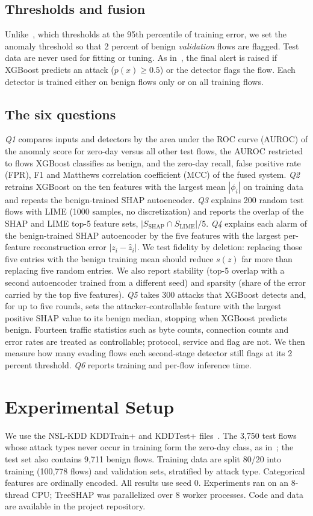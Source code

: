 \documentclass[conference]{IEEEtran}
\begin{document}
\subsection{Thresholds and fusion}
Unlike~\cite{barnard2022robust}, which thresholds at the 95th percentile of training error, we set the anomaly threshold so that 2 percent of benign \emph{validation} flows are flagged. Test data are never used for fitting or tuning. As in~\cite{barnard2022robust}, the final alert is raised if XGBoost predicts an attack ($p(x)\geq 0.5$) or the detector flags the flow. Each detector is trained either on benign flows only or on all training flows.

\subsection{The six questions}
\textit{Q1} compares inputs and detectors by the area under the ROC curve (AUROC) of the anomaly score for zero-day versus all other test flows, the AUROC restricted to flows XGBoost classifies as benign, and the zero-day recall, false positive rate (FPR), F1 and Matthews correlation coefficient (MCC) of the fused system.
\textit{Q2} retrains XGBoost on the ten features with the largest mean $|\phi_i|$ on training data and repeats the benign-trained SHAP autoencoder.
\textit{Q3} explains 200 random test flows with LIME (1000 samples, no discretization) and reports the overlap of the SHAP and LIME top-5 feature sets, $|S_{\mathrm{SHAP}}\cap S_{\mathrm{LIME}}|/5$.
\textit{Q4} explains each alarm of the benign-trained SHAP autoencoder by the five features with the largest per-feature reconstruction error $|z_i-\hat{z}_i|$. We test fidelity by deletion: replacing those five entries with the benign training mean should reduce $s(z)$ far more than replacing five random entries. We also report stability (top-5 overlap with a second autoencoder trained from a different seed) and sparsity (share of the error carried by the top five features).
\textit{Q5} takes 300 attacks that XGBoost detects and, for up to five rounds, sets the attacker-controllable feature with the largest positive SHAP value to its benign median, stopping when XGBoost predicts benign. Fourteen traffic statistics such as byte counts, connection counts and error rates are treated as controllable; protocol, service and flag are not. We then measure how many evading flows each second-stage detector still flags at its 2 percent threshold.
\textit{Q6} reports training and per-flow inference time.

\section{Experimental Setup}
We use the NSL-KDD KDDTrain+ and KDDTest+ files~\cite{tavallaee2009nslkdd}. The 3,750 test flows whose attack types never occur in training form the zero-day class, as in~\cite{barnard2022robust}; the test set also contains 9,711 benign flows. Training data are split 80/20 into training (100,778 flows) and validation sets, stratified by attack type. Categorical features are ordinally encoded. All results use seed 0. Experiments ran on an 8-thread CPU; TreeSHAP was parallelized over 8 worker processes. Code and data are available in the project repository.
\end{document}
